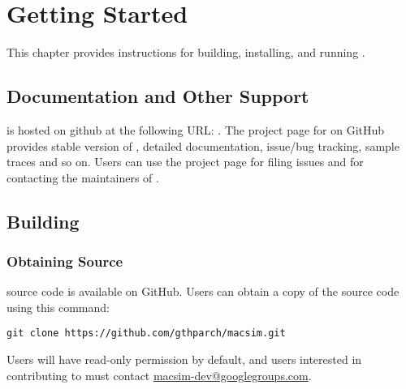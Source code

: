 

\chapter{Getting Started}


This chapter provides instructions for building, installing, and running \SIM.


\section{Documentation and Other Support}

\SIM is hosted on github at the following URL:
. 
The project page for \SIM on
GitHub provides stable version of \SIM, detailed documentation,
issue/bug tracking, sample traces and so on. Users can use the project
page for filing issues and for contacting the maintainers of \SIM.


\section{Building \SIM}
\label{sec:installation}


\subsection{Obtaining Source}

\SIM source code is available on GitHub. Users can obtain a copy of the
source code using this command:

\begin{Verbatim}
git clone https://github.com/gthparch/macsim.git
\end{Verbatim}

\noindent
Users will have read-only permission by default, and users interested in
contributing to \SIM must contact
\href{mailto:macsim-dev@googlegroups.com}{macsim-dev@googlegroups.com}.

